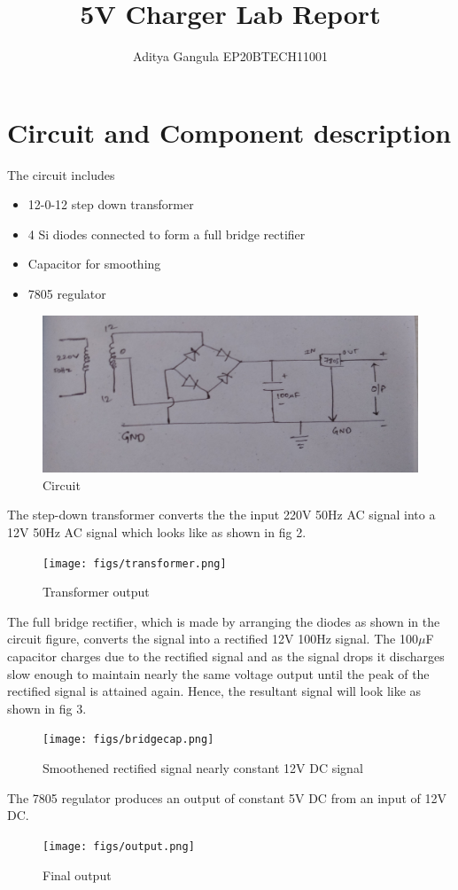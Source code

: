 \documentclass{article}
\title{5V Charger Lab Report}
\author{Aditya Gangula EP20BTECH11001}
\begin{document}
\maketitle

\section*{Circuit and Component description}
The circuit includes
\begin{itemize}
    \item 12-0-12 step down transformer
    \item 4 Si diodes connected to form a full bridge rectifier
    \item Capacitor for smoothing
    \item 7805 regulator
\end{itemize}
\begin{figure}
    \centering
    \includegraphics[width=\columnwidth]{figs/circuit.png}
    \caption{Circuit}
    \label{fig:circ}
\end{figure}
The step-down transformer converts the the input 220V 50Hz AC signal into a 12V 50Hz AC signal which looks like as shown in fig 2.\\
\begin{figure}[!h]
    \centering
    \texttt{[image: figs/transformer.png]}
    \caption{Transformer output}
    \label{fig:my_label}
\end{figure}
The full bridge rectifier, which is made by arranging the diodes as shown in the circuit figure, converts the signal into a rectified 12V 100Hz signal. The 100$\mu$F capacitor charges due to the rectified signal and as the signal drops it discharges slow enough to maintain nearly the same voltage output until the peak of the rectified signal is attained again. Hence, the resultant signal will look like as shown in fig 3.\\
\begin{figure}
    \centering
    \texttt{[image: figs/bridgecap.png]}
    \caption{Smoothened rectified signal nearly constant 12V DC signal}
    \label{fig:my_label}
\end{figure}
The 7805 regulator produces an output of constant 5V DC from an input of 12V DC.\\
\begin{figure}
    \centering
    \texttt{[image: figs/output.png]}
    \caption{Final output}
    \label{fig:my_label}
\end{figure}
\end{document}
